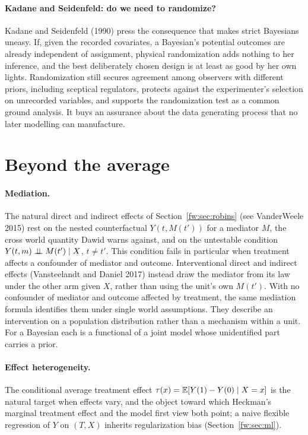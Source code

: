 \paragraph{Kadane and Seidenfeld: do we need to randomize?} Kadane and Seidenfeld (1990) press the consequence that makes strict Bayesians uneasy. If, given the recorded covariates, a Bayesian's potential outcomes are already independent of assignment, physical randomization adds nothing to her inference, and the best deliberately chosen design is at least as good by her own lights. Randomization still secures agreement among observers with different priors, including sceptical regulators, protects against the experimenter's selection on unrecorded variables, and supports the randomization test as a common ground analysis. It buys an assurance about the data generating process that no later modelling can manufacture.

\section{Beyond the average}\label{fw:sec:beyond}

\paragraph{Mediation.} The natural direct and indirect effects of Section~\ref{fw:sec:robins} (see VanderWeele 2015) rest on the nested counterfactual $Y(t,M(t'))$ for a mediator $M$, the cross world quantity Dawid warns against, and on the untestable condition $Y(t,m)\perp\!\!\!\perp M(t')\mid X$, $t\neq t'$. This condition fails in particular when treatment affects a confounder of mediator and outcome. Interventional direct and indirect effects (Vansteelandt and Daniel 2017) instead draw the mediator from its law under the other arm given $X$, rather than using the unit's own $M(t')$. With no confounder of mediator and outcome affected by treatment, the same mediation formula identifies them under single world assumptions. They describe an intervention on a population distribution rather than a mechanism within a unit. For a Bayesian each is a functional of a joint model whose unidentified part carries a prior.

\paragraph{Effect heterogeneity.} The conditional average treatment effect $\tau(x)=\mathbb{E}[Y(1)-Y(0)\mid X=x]$ is the natural target when effects vary, and the object toward which Heckman's marginal treatment effect and the model first view both point; a naive flexible regression of $Y$ on $(T,X)$ inherits regularization bias (Section~\ref{fw:sec:ml}).

